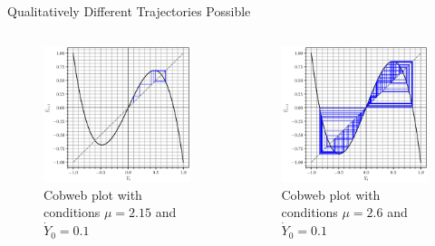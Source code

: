 \documentclass{beamer}
\begin{document}
\begin{frame}{Qualitatively Different Trajectories Possible}
	\begin{columns}
	\begin{column}{0.5\textwidth}
		\begin{figure}
			\centering
			\includegraphics[width=1.2\textwidth]{2-cyclic.eps}
			\caption{Cobweb plot with conditions $\mu=2.15$ and $\dot Y_0=0.1$}
		\end{figure}
	\end{column}
	\begin{column}{0.5\textwidth}
		\begin{figure}
			\centering
			\includegraphics[width=1.2\textwidth]{chaos_uncontained.eps}
			\caption{Cobweb plot with conditions $\mu=2.6$ and $\dot Y_0=0.1$}
		\end{figure}
	\end{column}
	\end{columns}
\end{frame}
\end{document}
